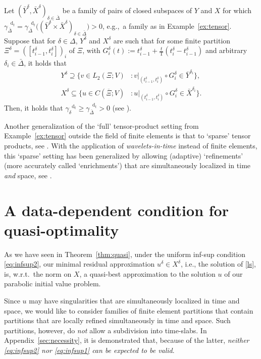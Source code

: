 \documentclass{amsart}
\numberwithin{equation}{section}
\newcommand{\1}{\mathbb 1}
\newcommand*\diff{\mathop{}\!\mathrm{d}}
\begin{document}
\begin{example} \label{ex:time-slab}
Let $(\bar{Y}^\delta, \bar{X}^\delta)_{\delta \in \bar{\Delta}}$ be a family of pairs of closed subspaces of $Y$ and $X$
for which $\gamma^{\diff_t}_{\bar{\Delta}}=\gamma^{\diff_t}_{\bar{\Delta}} \big((\bar{Y}^\delta \times \bar{X}^\delta)_{\delta \in \bar{\Delta}}\big)>0$, e.g.,~a family as in Example~\ref{ex:tensor}.
Suppose that for $\delta \in \Delta$, $Y^\delta$ and $X^\delta$ are such that for some
finite partition $\Xi^\delta=([t_{i-1}^\delta,t_{i}^\delta])_i$ of $\Xi$, with
$G^\delta_i(t):=t_{i-1}^\delta+\frac{t}{\mathrm{T}}(t_{i}^\delta-t_{i-1}^\delta)$ and arbitrary $\delta_i \in \bar{\Delta}$, it holds that
\begin{align*}
Y^\delta \supseteq \{v \in L_2(\Xi;V) &\colon v|_{(t^\delta_{i-1},t^\delta_i)} \circ G^\delta_i \in \bar{Y}^{\delta_i}\},\\
X^\delta \subseteq \{u \in C(\overline{\Xi};V) &\colon u|_{(t^\delta_{i-1},t^\delta_i)} \circ G^\delta_i \in \bar{X}^{\delta_i}\}.
\end{align*}
Then, it holds that $\gamma^{\diff_t}_\delta \geq \gamma^{\diff_t}_{\bar{\Delta}}>0$ (see \cite{249.99,249.992}).
\end{example}

\begin{remark} Another generalization of the `full' tensor-product setting from Example~\ref{ex:tensor} outside the field of finite elements is that to `sparse' tensor products, see \cite{11}.
With the application of \emph{wavelets-in-time} instead of finite elements, this `sparse' setting has been generalized by allowing (adaptive)  `refinements' (more accurately called `enrichments') that are simultaneously localized in time \emph{and} space, see \cite{249.991}. 
\end{remark}


\section{A data-dependent condition for quasi-optimality}  \label{sec:data-dependent}
As we have seen in Theorem~\ref{thm:quasi}, under the uniform inf-sup condition \eqref{eq:infsup2}, our minimal residual approximation $u^\delta \in X^\delta$, i.e., the solution of \eqref{ls}, is, w.r.t.~the norm on $X$, a quasi-best approximation to the solution $u$ of our parabolic initial value problem. 

Since $u$ may have singularities that are simultaneously localized in time and space, we would like to consider families of finite element partitions that contain partitions that are locally refined simultaneously in time and space. Such partitions, however, do \emph{not} allow a subdivision into time-slabs.
In Appendix~\ref{sec:necessity}, it is demonstrated that, because of the latter, \emph{neither \eqref{eq:infsup2} nor \eqref{eq:infsup1} can be expected to be valid}.
\medskip
\end{document}
